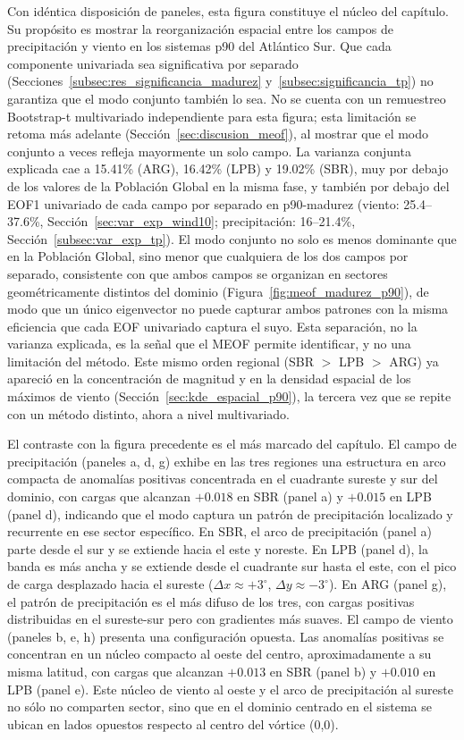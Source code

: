 Con idéntica disposición de paneles, esta figura constituye el núcleo del capítulo. Su propósito es mostrar la reorganización espacial entre los campos de precipitación y viento en los sistemas p90 del Atlántico Sur. Que cada componente univariada sea significativa por separado (Secciones~\ref{subsec:res_significancia_madurez} y~\ref{subsec:significancia_tp}) no garantiza que el modo conjunto también lo sea. No se cuenta con un remuestreo Bootstrap-t multivariado independiente para esta figura; esta limitación se retoma más adelante (Sección~\ref{sec:discusion_meof}), al mostrar que el modo conjunto a veces refleja mayormente un solo campo.
La varianza conjunta explicada cae a 15.41\% (ARG), 16.42\% (LPB) y 19.02\% (SBR), muy por debajo de los valores de la Población Global en la misma fase, y también por debajo del EOF1 univariado de cada campo por separado en p90-madurez (viento: 25.4--37.6\%, Sección~\ref{sec:var_exp_wind10}; precipitación: 16--21.4\%, Sección~\ref{subsec:var_exp_tp}). El modo conjunto no solo es menos dominante que en la Población Global, sino menor que cualquiera de los dos campos por separado, consistente con que ambos campos se organizan en sectores geométricamente distintos del dominio (Figura~\ref{fig:meof_madurez_p90}), de modo que un único eigenvector no puede capturar ambos patrones con la misma eficiencia que cada EOF univariado captura el suyo. Esta separación, no la varianza explicada, es la señal que el MEOF permite identificar, y no una limitación del método. Este mismo orden regional (SBR $>$ LPB $>$ ARG) ya apareció en la concentración de magnitud y en la densidad espacial de los máximos de viento (Sección~\ref{sec:kde_espacial_p90}), la tercera vez que se repite con un método distinto, ahora a nivel multivariado.

El contraste con la figura precedente es el más marcado del capítulo.
El campo de precipitación (paneles a, d, g) exhibe en las tres regiones una estructura en arco compacta de anomalías positivas concentrada en el cuadrante sureste y sur del dominio, con cargas que alcanzan $+0.018$ en SBR (panel a) y $+0.015$ en LPB (panel d), indicando que el modo captura un patrón de precipitación localizado y recurrente en ese sector específico. En SBR, el arco de precipitación (panel a) parte desde el sur y se extiende hacia el este y noreste.
En LPB (panel d), la banda es más ancha y se extiende desde el cuadrante sur hasta el este, con el pico de carga desplazado hacia el sureste ($\Delta x \approx +3^{\circ}$, $\Delta y \approx -3^{\circ}$). En ARG (panel g), el patrón de precipitación es el más difuso de los tres, con cargas positivas distribuidas en el sureste-sur pero con gradientes más suaves.
El campo de viento (paneles b, e, h) presenta una configuración opuesta. Las anomalías positivas se concentran en un núcleo compacto al oeste del centro, aproximadamente a su misma latitud, con cargas que alcanzan $+0.013$ en SBR (panel b) y $+0.010$ en LPB (panel e).
Este núcleo de viento al oeste y el arco de precipitación al sureste no sólo no comparten sector, sino que en el dominio centrado en el sistema se ubican en lados opuestos respecto al centro del vórtice (0,0).

